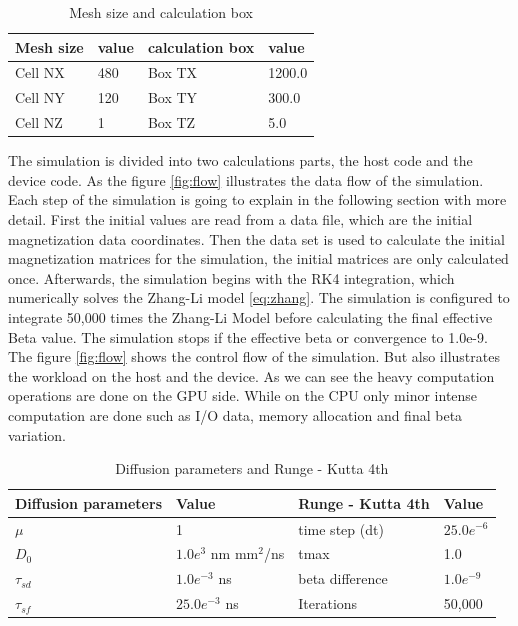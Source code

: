 \begin{table}[h]
\centering
\begin{tabular}{| l | l | l | l |}
\hline
Mesh size & value & calculation box & value \\
\hline
Cell NX & 480 & Box TX  & 1200.0   \\
\hline
Cell NY & 120 & Box TY  & 300.0  \\
\hline
Cell NZ &	1 & Box TZ  & 5.0   \\
\hline
\end{tabular}
\caption{Mesh size and calculation box}
\label{tab:mesh}
\end{table}

The simulation is divided into two calculations parts, the host code and the device code. As the figure \ref{fig:flow} illustrates the data flow of the simulation. Each step of the simulation is going to explain in the following section with more detail. First the initial values are read from a data file, which are the initial magnetization data coordinates. Then the data set is used to calculate the initial magnetization matrices for the simulation, the initial matrices are only calculated once. Afterwards, the simulation begins with the RK4 integration, which numerically solves the  Zhang-Li model \ref{eq:zhang}. The simulation is configured to integrate 50,000 times the Zhang-Li Model before calculating the final effective Beta value. The simulation stops if the effective beta or convergence to 1.0e-9. The figure \ref{fig:flow} shows the control flow of the simulation. But also illustrates the workload on the host and the device. As we can see the heavy computation operations are done on the GPU side. While on the CPU only minor intense computation are done such as I/O data, memory allocation and final beta variation.

\begin{table}[h]
\centering
\begin{tabular}{| l | l | l | l |}
\hline
Diffusion parameters& Value & Runge - Kutta 4th & Value \\
\hline 
$\mu$ & 1 &  time step (dt) &   $25.0e^{-6}$   \\
\hline
$D_{0}$ & $1.0e^{3}$ nm mm$^2$/ns  & tmax  & 1.0  \\
\hline
$\tau_{sd}$ & $1.0e^{-3}$ ns  & beta difference & $1.0e^{-9}$ \\
\hline
$\tau_{sf}$ & $25.0e^{-3}$ ns  & Iterations & 50,000 \\
\hline
\end{tabular}
\caption{Diffusion parameters and Runge - Kutta 4th}
\label{tab:drk}
\end{table}

